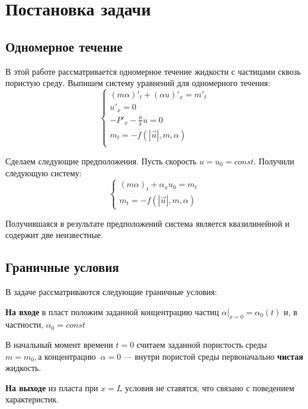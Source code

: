 \section{Постановка задачи}
\subsection{Одномерное течение}
\par В этой работе рассматривается одномерное течение жидкости с частицами сквозь пористую среду. Выпишем систему уравнений для одномерного течения:
$$\displaystyle \begin {cases}
(m\alpha)'_{t}+(\alpha u)'_{x}=m'_{t}\\
u'_{x}=0\\
\displaystyle -P'_{x}-\frac{\mu}{k}u=0\\
m_{t}=-f(|\vec{u}|, m, \alpha)\\
\end {cases}$$

\par Сделаем следующие предположения. Пусть скорость $u=u_{0}=const$. Получили следующую систему:\\
$$\begin {cases}
(m\alpha)_{t}+\alpha_{x}u_{0}=m_{t}\\
m_{t}=-f(|\vec{u}|, m, \alpha)
\end{cases}$$
\par Получившаяся в результате предположений система является квазилинейной и содержит две неизвестные.

\subsection{Граничные условия}
\par В задаче рассматриваются следующие граничные условия:
\par \textbf{На входе} в пласт положим заданной концентрацию частиц $\alpha|_{x=0}=\alpha_{0}(t)$ и, в частности, $\alpha_{0}=const$\\
\par В начальный момент времени $t=0$ считаем заданной пористость среды  $m=m_{0},\text{а концентрацию}\;\;\alpha=0$ --- внутри пористой среды первоначально \textbf{чистая} жидкость.\\
\par \textbf{На выходе} из пласта при $x=L$ условия не ставятся, что связано с поведением характеристик.\\
\pagebreak
